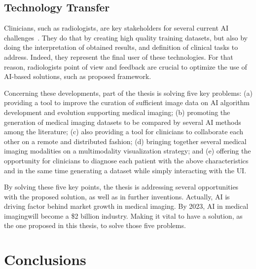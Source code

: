 \subsection{Technology Transfer}
\label{sec:sec004005002}

Clinicians, such as radiologists, are key stakeholders for several current \ac{AI} challenges~\cite{pesapane2018artificial}.
They do that by creating high quality training datasets, but also by doing the interpretation of obtained results, and definition of clinical tasks to address.
Indeed, they represent the final user of these technologies.
For that reason, radiologists point of view and feedback are crucial to optimize the use of \ac{AI}-based solutions, such as proposed framework.

Concerning these developments, part of the thesis is solving five key problems:
(a) providing a tool to improve the curation of sufficient image data on \ac{AI} algorithm development and evolution supporting medical imaging;
(b) promoting the generation of medical imaging datasets to be compared by several \ac{AI} methods among the literature;
(c) also providing a tool for clinicians to collaborate each other on a remote and distributed fashion;
(d) bringing together several medical imaging modalities on a multimodality visualization strategy; and
(e) offering the opportunity for clinicians to diagnose each patient with the above characteristics and in the same time generating a dataset while simply interacting with the \ac{UI}.

By solving these five key points, the thesis is addressing several opportunities with the proposed solution, as well as in further inventions.
Actually, \ac{AI} is driving factor behind market growth in medical imaging.
By 2023, \ac{AI} in medical imaging\footnotemark[19] will become a \$2 billion industry.
Making it vital to have a solution, as the one proposed in this thesis, to solve those five problems.


\section{Conclusions}
\label{sec:sec004006}

